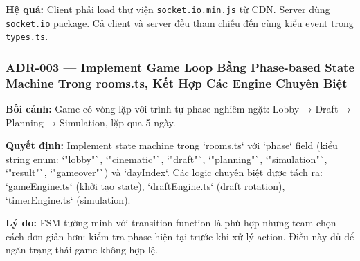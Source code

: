 \textbf{Hệ quả:} Client phải load thư viện \texttt{socket.io.min.js} từ CDN. Server dùng \texttt{socket.io} package. Cả client và server đều tham chiếu đến cùng kiểu event trong \texttt{types.ts}.


\subsubsection*{ADR-003 — Implement Game Loop Bằng Phase-based State Machine Trong rooms.ts, Kết Hợp Các Engine Chuyên Biệt}

\textbf{Bối cảnh:} Game có vòng lặp với trình tự phase nghiêm ngặt: Lobby → Draft → Planning → Simulation, lặp qua 5 ngày.






\textbf{Quyết định:} Implement state machine trong `rooms.ts` với `phase` field (kiểu string enum: `"lobby"`, `"cinematic"`, `"draft"`, `"planning"`, `"simulation"`, `"result"`, `"gameover"`) và `dayIndex`. Các logic chuyên biệt được tách ra: `gameEngine.ts` (khởi tạo state), `draftEngine.ts` (draft rotation), `timerEngine.ts` (simulation).

\textbf{Lý do:} FSM tường minh với transition function là phù hợp nhưng team chọn cách đơn giản hơn: kiểm tra phase hiện tại trước khi xử lý action. Điều này đủ để ngăn trạng thái game không hợp lệ.

